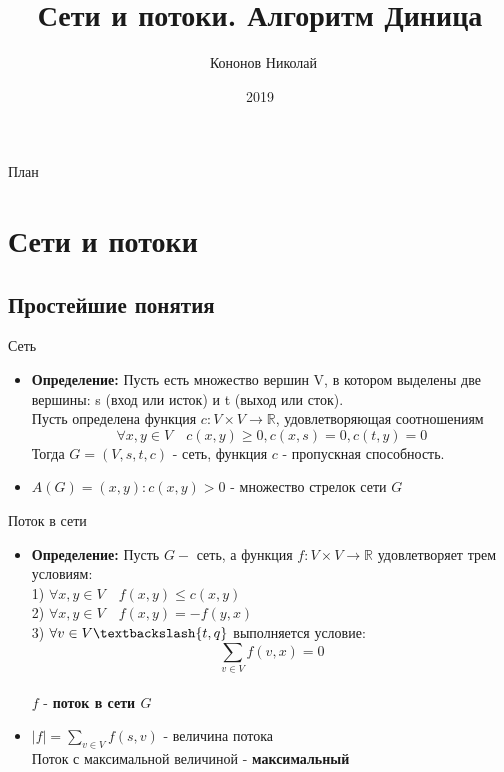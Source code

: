 \documentclass{beamer}
\title{Сети и потоки. Алгоритм Диница}
\author{~Кононов Николай}
\institute[СПБГУ]
{
    Математико-Механический факультет СПбГУ
}
\date{2019}
\begin{document}
\begin{frame}
  \titlepage
\end{frame}

\begin{frame}{План}
  \tableofcontents
\end{frame}


\section{Сети и потоки}

\subsection{Простейшие понятия}

\begin{frame}{Сеть}
  \begin{itemize}
  \item {
    \textbf{Определение: } Пусть есть множество вершин V, в котором выделены две вершины: s (вход или исток) и t (выход или сток). \\Пусть определена функция $c:V \times V \rightarrow \mathbb{R}$, удовлетворяющая соотношениям $$\forall x, y \in V \quad c(x, y) \geq 0, c(x, s) = 0, c(t, y) = 0 $$
    Тогда $ G = (V, s, t, c) $ - сеть, функция $c$ - пропускная способность.
    \pause
  }
  \item {
    $A(G) = {(x, y) : c(x, y) > 0}$ - множество стрелок сети $G$
  }
  \end{itemize}
\end{frame}

\begin{frame}{Поток в сети}
  \begin{itemize}
  \item {
    \textbf{Определение: } Пусть $G - $ сеть, а функция $f:V \times V \rightarrow \mathbb{R}$ удовлетворяет трем условиям:\\
        1) $\forall x, y \in V \quad f(x, y) \leq c(x, y)$\\
        2) $\forall x, y \in V \quad f(x, y) = -f(y, x)$\\
        3) $\forall v \in V\textbackslash{t, q}$ выполняется условие: $$ \sum\limits_{v \in V} f(v, x) = 0$$
    \\ $f$ - \textbf{поток в сети $G$}
    \pause
  }
  \item {
    $ |f| = \sum\limits_{v \in V} f(s, v)$ - величина потока\\
        Поток с максимальной величиной - \textbf{максимальный}
  }
  \end{itemize}
\end{frame}
\end{document}
